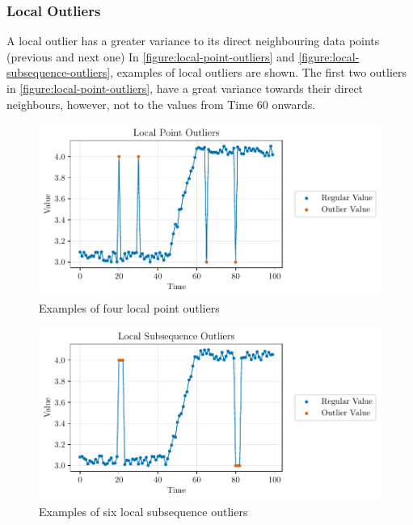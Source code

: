 \subsubsection{Local Outliers}
A local outlier has a greater variance to its direct neighbouring data points (previous and next one) \cite{blazquez-garciaReviewOutlierAnomaly2020} In \autoref{figure:local-point-outliers} and \autoref{figure:local-subsequence-outliers}, examples of local outliers are shown. The first two outliers in \autoref{figure:local-point-outliers}, have a great variance towards their direct neighbours, however, not to the values from Time 60 onwards.
\begin{figure}[H]
  \centering
  \includegraphics{./plots/pdfs/local_point_outliers.pdf}
  \caption{Examples of four local point outliers}
  \label{figure:local-point-outliers}
\end{figure}
\begin{figure}[H]
  \centering
  \includegraphics{./plots/pdfs/local_subsequence_outliers.pdf}
  \caption{Examples of six local subsequence outliers}
  \label{figure:local-subsequence-outliers}
\end{figure}
